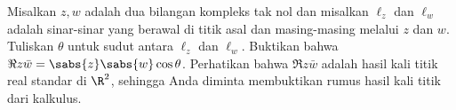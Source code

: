 
\begin{exbox}
\begin{exercise}
Misalkan $z,w$ adalah dua bilangan kompleks tak nol dan misalkan
$\ell_z$ dan $\ell_w$ adalah sinar-sinar yang berawal di titik asal dan
masing-masing melalui
$z$ dan $w$. Tuliskan $\theta$ untuk sudut antara $\ell_z$ dan
$\ell_w$. Buktikan bahwa
$\Re z\bar{w} = \sabs{z} \sabs{w} \cos \theta$.
Perhatikan bahwa $\Re z\bar{w}$ adalah hasil kali titik real standar di $\R^2$, sehingga
Anda diminta membuktikan rumus hasil kali titik dari kalkulus.
\end{exercise}
\end{exbox}
